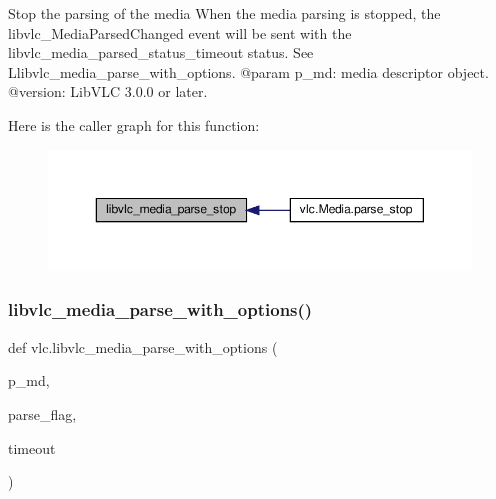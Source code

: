 \begin{DoxyVerb}Stop the parsing of the media
When the media parsing is stopped, the libvlc_MediaParsedChanged event will
be sent with the libvlc_media_parsed_status_timeout status.
See L{libvlc_media_parse_with_options}.
@param p_md: media descriptor object.
@version: LibVLC 3.0.0 or later.
\end{DoxyVerb}
 Here is the caller graph for this function\+:
\nopagebreak
\begin{figure}[H]
\begin{center}
\leavevmode
\includegraphics[width=350pt]{namespacevlc_ad065972236e02109d2814383f5dfaaf8_icgraph}
\end{center}
\end{figure}
\mbox{\label{namespacevlc_ac6734416f4493c5b44911e1ad49d0444}} 
\subsubsection{\texorpdfstring{libvlc\+\_\+media\+\_\+parse\+\_\+with\+\_\+options()}{libvlc\_media\_parse\_with\_options()}}
{\footnotesize\ttfamily def vlc.\+libvlc\+\_\+media\+\_\+parse\+\_\+with\+\_\+options (\begin{DoxyParamCaption}\item[{}]{p\+\_\+md,  }\item[{}]{parse\+\_\+flag,  }\item[{}]{timeout }\end{DoxyParamCaption})}

